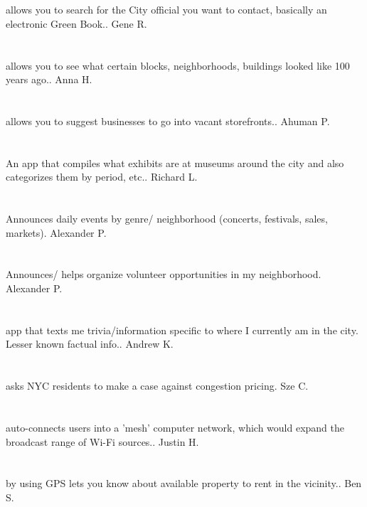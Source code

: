 \section{}allows you to search for the City official you want to contact,  basically an electronic Green Book.. Gene R.
\section{}allows you to see what certain blocks,  neighborhoods,  buildings looked like 100 years ago.. Anna H.
\section{}allows you to suggest businesses to go into vacant storefronts.. Ahuman P.
\section{}An app that compiles what exhibits are at museums around the city and also categorizes them by period,  etc.. Richard L.
\section{}Announces daily events by genre/ neighborhood (concerts,  festivals,  sales,  markets). Alexander P.
\section{}Announces/ helps organize volunteer opportunities in my neighborhood. Alexander P.
\section{}app that texts me trivia/information specific to where I currently am in the city.  Lesser known factual info.. Andrew K.
\section{}asks NYC residents to make a case against congestion pricing. Sze C.
\section{}auto-connects users into a 'mesh' computer network,  which would expand the broadcast range of Wi-Fi sources.. Justin H.
\section{}by using GPS lets you know about available property to rent in the vicinity.. Ben S.
